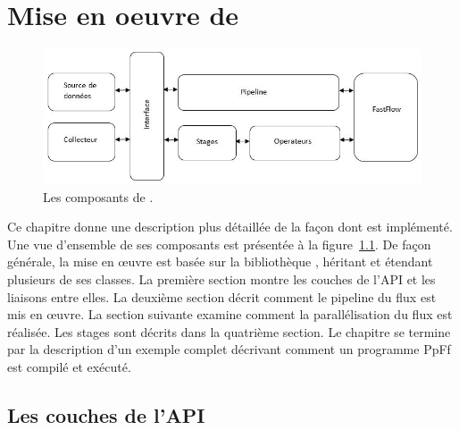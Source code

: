 
\chapter{Mise en oeuvre de \PpFf}
\label{implementation.chap}




\begin{figure}[ht]
\centering
     \includegraphics[width=1.0\textwidth]{Figures/AllComponentsAPI.jpg}
      \caption{Les composants de .}
       \label{AllComponentsAPI.fig}
\end{figure}


Ce chapitre donne une description plus d\'etaill\'ee de la fa\c{c}on dont  est impl\'ement\'e. Une vue d'ensemble de ses composants est pr\'esent\'ee à la figure~\ref{AllComponentsAPI.fig}. De fa\c{c}on g\'en\'erale, la mise en \oe{}uvre est bas\'ee sur la biblioth\`eque , h\'eritant et \'etendant plusieurs de ses classes. La premi\`ere section montre les couches de l'API et les liaisons entre elles.  La deuxi\`eme section d\'ecrit comment le pipeline du flux est mis en œuvre. La section suivante examine comment la parall\'elisation du flux est r\'ealis\'ee. Les stages sont d\'ecrits dans la quatri\`eme section. Le chapitre se termine par la description d'un exemple complet d\'ecrivant comment un programme PpFf est compil\'e et ex\'ecut\'e.


\section{Les couches de l'API}

